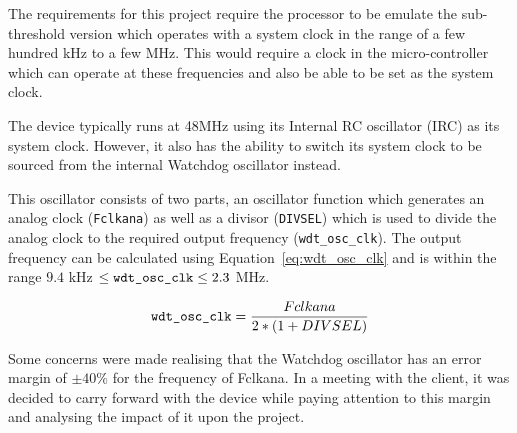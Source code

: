 The requirements for this project require the processor to be emulate the sub-threshold version which operates with a system clock in the range of a few hundred kHz to a few MHz. This would require a clock in the micro-controller which can operate at these frequencies and also be able to be set as the system clock.

The device typically runs at 48MHz using its Internal RC oscillator (IRC) as its system clock. However, it also has the ability to switch its system clock to be sourced from the internal Watchdog oscillator instead. 

This oscillator consists of two parts, an oscillator function which generates an analog clock (\verb|Fclkana|) as well as a divisor (\verb|DIVSEL|) which is used to divide the analog clock to the required output frequency (\verb|wdt_osc_clk|). The output frequency can be calculated using Equation~\ref{eq:wdt_osc_clk} and is within the range $ 9.4 $ kHz $ \leq \verb|wdt_osc_clk| \leq 2.3 $ MHz. \cite{mbed_datasheet}

\begin{equation}
	\label{eq:wdt_osc_clk}
	\verb|wdt_osc_clk| = \frac{Fclkana}{2 * (1 + DIVSEL)}
\end{equation}

Some concerns were made realising that the Watchdog oscillator has an error margin of $\pm 40\%$ for the frequency of Fclkana. In a meeting with the client, it was decided to carry forward with the device while paying attention to this margin and analysing the impact of it upon the project.